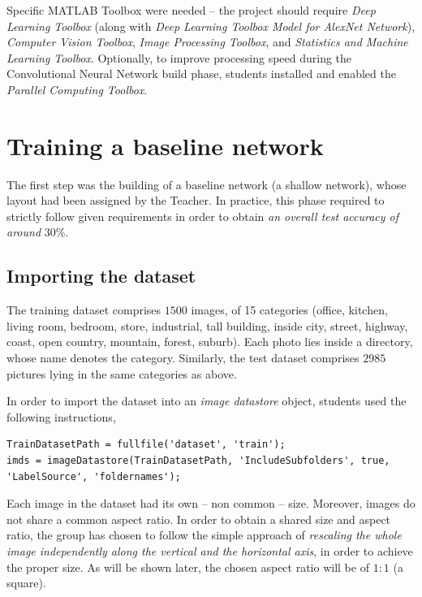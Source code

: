 \documentclass[a4paper, 11pt]{article} %
\begin{document}
Specific MATLAB Toolbox were needed \--- the project should require \emph{Deep Learning Toolbox} (along with \emph{Deep Learning Toolbox Model for AlexNet Network}), \emph{Computer Vision Toolbox}, \emph{Image Processing Toolbox}, and \emph{Statistics and Machine Learning Toolbox}. Optionally, to improve processing speed during the Convolutional Neural Network build phase, students installed and enabled the \emph{Parallel Computing Toolbox}.






\section{Training a baseline network}\label{sec:baseline-network}

The first step was the building of a baseline network (a shallow network), whose layout had been assigned by the Teacher. In practice, this phase required to strictly follow given requirements in order to obtain \emph{an overall test accuracy of around} $30\%$.

\subsection{Importing the dataset} 

The training dataset comprises $1500$ images, of 15 categories (office, kitchen, living room, bedroom, store, industrial, tall building, inside city, street, highway, coast, open country, mountain, forest, suburb). Each photo lies inside a directory, whose name denotes the category. Similarly, the test dataset comprises $2985$ pictures lying in the same categories as above.

In order to import the dataset into an \emph{image datastore} object, students used the following instructions,

\begin{lstlisting}
TrainDatasetPath = fullfile('dataset', 'train');
imds = imageDatastore(TrainDatasetPath, 'IncludeSubfolders', true, 'LabelSource', 'foldernames');
\end{lstlisting}

Each image in the dataset had its own \--- non common \--- size. Moreover, images do not share a common aspect ratio. In order to obtain a shared size and aspect ratio, the group has chosen to follow the simple approach of \emph{rescaling the whole image independently along the vertical and the horizontal axis}, in order to achieve the proper size. As will be shown later, the chosen aspect ratio will be of $1:1$ (a square).
\end{document}
